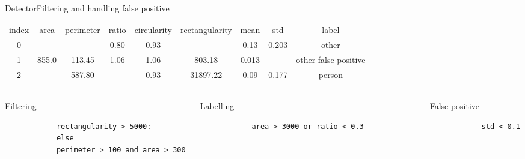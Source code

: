 \documentclass{beamer}
\begin{document}
\begin{frame}[fragile]{Detector}{Filtering and handling false positive}
\tiny
\hspace*{-1cm}\begin{tabular}[h]{ccccccccc}
index & area	& perimeter & 	ratio & circularity & rectangularity & mean & std & label \\
0 & \color{orange}{1243.0} & \color{orange}{146.76} & 0.80 & 0.93 & \color{red}{1545.35} & 0.13 & 0.203 & other \\
1 & 855.0 & 113.45 & 1.06 & 1.06 & 803.18 & 0.013 & \color{darkmagenta}{0.020} & other false positive \\
2 & \color{applegreen}{15028.5} & 587.80 & \color{blue}{0.47} & 0.93 & 31897.22 & 0.09 & 0.177 & person
\end{tabular}        


\begin{columns}
    \begin{column}[t]{0.33\textwidth}
        \centering
        Filtering
        \begin{verbatim}
            rectangularity > 5000:
            else
            perimeter > 100 and area > 300
        \end{verbatim}        
    \end{column}
    \begin{column}[t]{0.33\textwidth}
        \centering
        Labelling
        \begin{verbatim}
            area > 3000 or ratio < 0.3            
        \end{verbatim}
    \end{column}
    \begin{column}[t]{0.33\textwidth}
        \centering
        False positive
        \begin{verbatim}
            std < 0.1
        \end{verbatim}
    \end{column}

\end{columns}
\end{frame}
\end{document}
